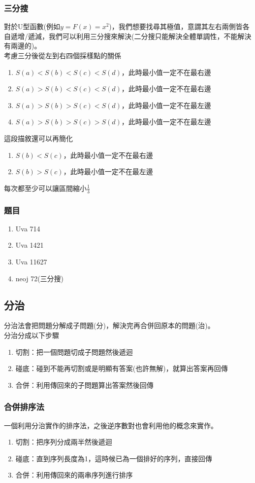 \subsubsection{三分搜}
對於U型函數(例如$y=F(x)=x^2$)，我們想要找尋其極值，意謂其左右兩側皆各自遞增/遞減，我們可以利用三分搜來解決(二分搜只能解決全體單調性，不能解決有兩邊的)。\\
考慮三分後從左到右四個採樣點的關係
\begin{enumerate}
\item $S(a) < S(b) < S(c) < S(d)$，此時最小值一定不在最右邊
\item $S(a) > S(b) < S(c) < S(d)$，此時最小值一定不在最右邊
\item $S(a) > S(b) > S(c) < S(d)$，此時最小值一定不在最左邊
\item $S(a) > S(b) > S(c) > S(d)$，此時最小值一定不在最左邊
\end{enumerate}
這段描敘還可以再簡化
\begin{enumerate}
\item $S(b) < S(c)$，此時最小值一定不在最右邊
\item $S(b) > S(c)$，此時最小值一定不在最左邊
\end{enumerate}
每次都至少可以讓區間縮小$\frac{1}{3}$

\subsubsection{題目}
\begin{enumerate}
\item Uva 714
\item Uva 1421
\item Uva 11627
\item neoj 72(三分搜)
\end{enumerate}
\subsection{分治}
分治法會把問題分解成子問題(分)，解決完再合併回原本的問題(治)。\\
分治分成以下步驟
\begin{enumerate}
\item 切割：把一個問題切成子問題然後遞迴
\item 碰底：碰到不能再切割或是明顯有答案(也許無解)，就算出答案再回傳
\item 合併：利用傳回來的子問題算出答案然後回傳
\end{enumerate}
\subsubsection{合併排序法}
一個利用分治實作的排序法，之後逆序數對也會利用他的概念來實作。
\begin{enumerate}
\item 切割：把序列分成兩半然後遞迴
\item 碰底：直到序列長度為1，這時候已為一個排好的序列，直接回傳
\item 合併：利用傳回來的兩串序列進行排序
\end{enumerate}
